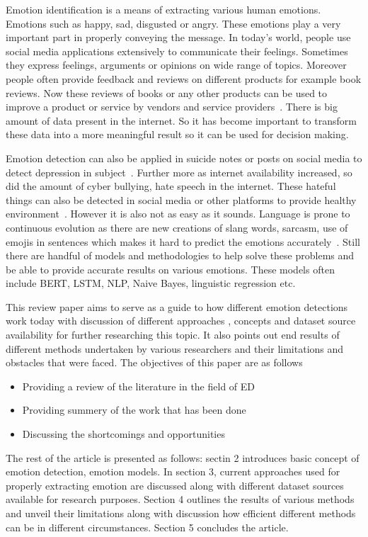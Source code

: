 \documentclass[runningheads]{llncs}
\begin{document}
Emotion identification is a means of extracting various human emotions. Emotions such as happy, sad, disgusted or angry. These emotions play a very important part in properly conveying the message. In today's world, people use social media applications extensively to communicate their feelings. Sometimes they express feelings, arguments or opinions on wide range of topics. Moreover people often provide feedback and reviews on different products for example book reviews. Now these reviews of books or any other products can be used to improve a product or service by vendors and service providers~\cite{ref4}. There is big amount of data present in the internet. So it has become important to transform these data into a more meaningful result so it can be used for decision making.

Emotion detection can also be applied in suicide notes or posts on social media to detect depression in subject~\cite{ref5}. Further more as internet availability increased, so did the amount of cyber bullying, hate speech in the internet. These hateful things can also be detected in social media or other platforms to provide healthy environment~\cite{ref3}. However it is also not as easy as it sounds. Language is prone to continuous evolution as there are new creations of slang words, sarcasm, use of emojis in sentences which makes it hard to predict the emotions accurately~\cite{ref6}. Still there are handful of models and methodologies to help solve these problems and be able to provide accurate results on various emotions. These models often include BERT, LSTM, NLP, Naive Bayes, linguistic regression etc. 

This review paper aims to serve as a guide to how different emotion detections work today with discussion of different approaches , concepts and dataset source availability for further researching this topic. It also points out end results of different methods undertaken by various researchers and their limitations and obstacles that were faced. The objectives of this paper are as follows
\begin{itemize}
\item Providing a review of the literature in the field of ED
\item Providing summery of the work that has been done
\item Discussing the shortcomings and opportunities
\end{itemize}

The rest of the article is presented as follows: sectin 2 introduces basic concept of emotion detection, emotion models. In section 3, current approaches used for properly extracting emotion are discussed along with different dataset sources available for research purposes. Section 4 outlines the results of various methods and unveil their limitations along with discussion how efficient different methods can be in different circumstances. Section 5 concludes the article.
\end{document}
